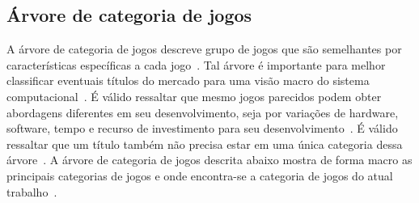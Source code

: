 \subsection{Árvore de categoria de jogos}
\label{sec:arvore_de_categoria_de_jogos}


A árvore de categoria de jogos descreve grupo de jogos que são semelhantes por características específicas a cada jogo~\cite{video_game_technologies}.
%
Tal árvore é importante para melhor classificar eventuais títulos do mercado para uma visão macro do sistema computacional~\cite{video_game_technologies}.
%
É válido ressaltar que mesmo jogos parecidos podem obter abordagens diferentes em seu desenvolvimento, seja por variações de hardware, software, tempo e recurso de investimento para seu desenvolvimento~\cite{video_game_technologies}.
%
É válido ressaltar que um título também não precisa estar em uma única categoria dessa árvore~\cite{video_game_technologies}.
%
A árvore de categoria de jogos descrita abaixo mostra de forma macro as principais categorias de jogos e onde encontra-se a categoria de jogos do atual trabalho~\cite{video_game_technologies}.


